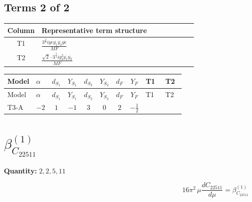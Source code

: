 \documentclass[8pt]{article}
\begin{document}
\begin{landscape}
\subsection*{Terms 2 of 2}
\begin{center}
\begin{tabular}{@{}c >{\raggedright\arraybackslash}p{0.82\linewidth}@{}}
\toprule
Column & Representative term structure \\
\midrule
T1 & \(\displaystyle \frac{3^{\frac{3}{4}} i ye \overline{y_{1}} \overline{y_{2}} \overline{ye}}{MF}\) \\
\midrule
T2 & \(\displaystyle \frac{\sqrt{2} \cdot 3^{\frac{3}{4}} i g_{2}^{2} \overline{y_{1}} \overline{y_{2}}}{MF}\) \\
\midrule
\bottomrule
\end{tabular}
\end{center}
\smallskip
\tiny
\begin{longtable}{@{}llcccccc >{\raggedright\arraybackslash}p{0.21\linewidth} >{\raggedright\arraybackslash}p{0.21\linewidth}@{}}
\toprule
Model & $\alpha$ & $d_{S_1}$ & $Y_{S_1}$ & $d_{S_2}$ & $Y_{S_2}$ & $d_F$ & $Y_F$ & T1 & T2 \\
\midrule
\endfirsthead
\toprule
Model & $\alpha$ & $d_{S_1}$ & $Y_{S_1}$ & $d_{S_2}$ & $Y_{S_2}$ & $d_F$ & $Y_F$ & T1 & T2 \\
\midrule
\endhead
T3-A & $-2$ & $1$ & $-1$ & $3$ & $0$ & $2$ & $-\frac{1}{2}$ & \scriptsize\adjustbox{max width=\linewidth}{$\begin{gathered} - \frac{3^{\frac{3}{4}} i ye \overline{y_{1}} \overline{y_{2}} \overline{ye}}{12 MF}\end{gathered}$} & \scriptsize\adjustbox{max width=\linewidth}{$\begin{gathered} \frac{\sqrt{2} \cdot 3^{\frac{3}{4}} i g_{2}^{2} \overline{y_{1}} \overline{y_{2}}}{3 MF}\end{gathered}$} \\
\midrule
\bottomrule
\end{longtable}
\clearpage
\section*{$\beta_{C_{22511}}^{(1)}$}
\noindent\textbf{Quantity: }$\mathrm{2,2,5,11}$\par\smallskip
\[16\pi^2\,\mu\frac{d C_{22511}}{d\mu}=\beta_{C_{22511}}^{(1)}\]

\end{landscape}
\end{document}
